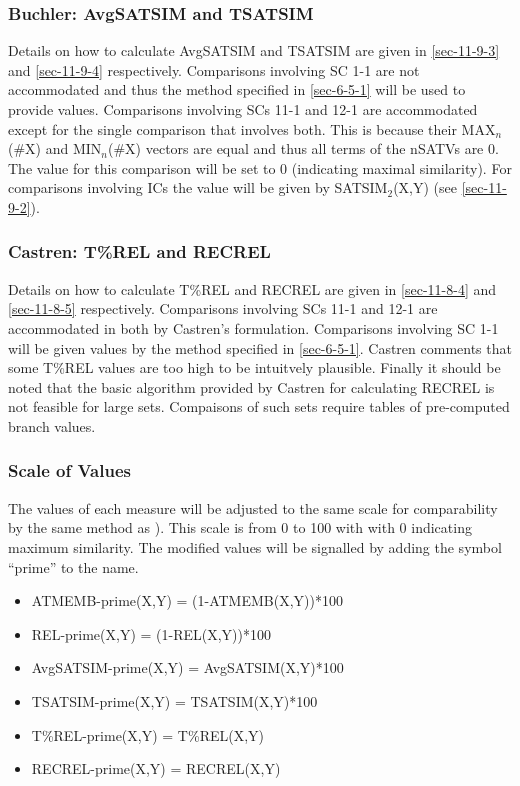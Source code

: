 \documentclass{article}
\begin{document}
\subsubsection{Buchler: AvgSATSIM and TSATSIM}
\label{sec-6-5-4}

Details on how to calculate AvgSATSIM and TSATSIM are given in
\ref{sec-11-9-3} and \ref{sec-11-9-4} respectively. Comparisons involving SC 1-1 are
not accommodated and thus the method specified in \ref{sec-6-5-1} will
be used to provide values. Comparisons involving SCs 11-1 and 12-1 are
accommodated except for the single comparison that involves both. This
is because their MAX$_{n}$(\#X) and MIN$_{n}$(\#X) vectors are equal and
thus all terms of the nSATVs are 0. The value for this comparison will
be set to 0 (indicating maximal similarity). For comparisons involving
ICs the value will be given by SATSIM$_{2}$(X,Y) (see \ref{sec-11-9-2}).
\subsubsection{Castren: T\%REL and RECREL}
\label{sec-6-5-5}

Details on how to calculate T\%REL and RECREL are given in \ref{sec-11-8-4} and
\ref{sec-11-8-5} respectively. Comparisons involving SCs 11-1 and 12-1 are
accommodated in both by Castren's formulation. Comparisons involving
SC 1-1 will be given values by the method specified in \ref{sec-6-5-1}. Castren comments that some T\%REL values are too high to be
intuitvely plausible. Finally it should be noted that the basic
algorithm provided by Castren for calculating RECREL is not feasible
for large sets. Compaisons of such sets require tables of pre-computed
branch values.
\subsubsection{Scale of Values}
\label{sec-6-5-6}

The values of each measure will be adjusted to the same scale for
comparability by the same method as \citet[pp. 48]{Kuusi2001}). This
scale is from 0 to 100 with with 0 indicating maximum similarity. The
modified values will be signalled by adding the symbol ``prime'' to the
name.
\begin{itemize}
\item ATMEMB-prime(X,Y) = (1-ATMEMB(X,Y))*100
\item REL-prime(X,Y) = (1-REL(X,Y))*100
\item AvgSATSIM-prime(X,Y) = AvgSATSIM(X,Y)*100
\item TSATSIM-prime(X,Y) = TSATSIM(X,Y)*100
\item T\%REL-prime(X,Y) = T\%REL(X,Y)
\item RECREL-prime(X,Y) = RECREL(X,Y)
\end{itemize}
\end{document}
